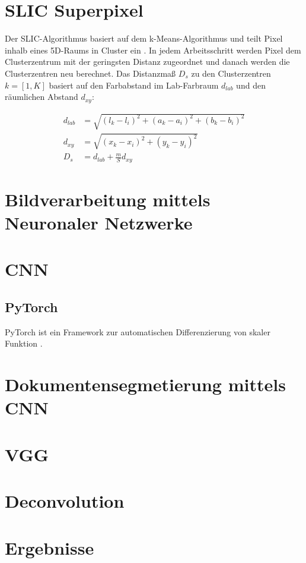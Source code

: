 \section{SLIC Superpixel}
Der SLIC-Algorithmus basiert auf dem k-Means-Algorithmus und teilt Pixel inhalb eines 5D-Raums in Cluster ein \autocite{AchantaSLICSuperpixels2010}. 
In jedem Arbeitsschritt werden Pixel dem Clusterzentrum mit der geringsten Distanz zugeordnet und danach werden die Clusterzentren neu berechnet.
Das Distanzmaß \(D_s\) zu den Clusterzentren \(k=[1,K]\) basiert auf den Farbabstand im Lab-Farbraum \(d_{lab}\) und den räumlichen Abstand \(d_{xy}\):

\begin{align}
    d_{lab} &= \sqrt{ \left( l_k - l_i \right)^2 + \left( a_k - a_i \right)^2 + \left( b_k - b_i \right)^2 }\\
    d_{xy}  &= \sqrt{ \left( x_k - x_i \right)^2 + \left(y_k - y_i \right)^2 }\\
    D_{s}   &= d_{lab} + \frac{m}{S} d_{xy}
\end{align}

\section{Bildverarbeitung mittels Neuronaler Netzwerke}
\section{CNN}


\subsection{PyTorch}
PyTorch ist ein Framework zur automatischen Differenzierung von skaler Funktion \autocite{PaszkeAutomaticdifferentiationPyTorch2017}.

\section{Dokumentensegmetierung mittels CNN}



\section{\textcite{XuPageSegmentationHistorical2017}}
\section{VGG}
\section{Deconvolution}
\section{Ergebnisse}